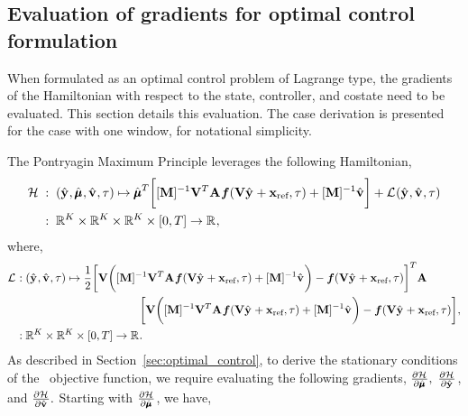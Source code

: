 \documentclass[3p,computermodern,10pt]{elsarticle}
\begin{document}
\begin{appendices}
\section{Evaluation of gradients for optimal control formulation}\label{appendix:optimal_control}
When formulated as an optimal control problem of Lagrange type, the gradients of the Hamiltonian with respect to the state, controller, and costate 
need to be evaluated. This section details this evaluation. The case derivation is presented for the case with one window, for notational simplicity.

The Pontryagin Maximum Principle leverages the following Hamiltonian,
\begin{align*}
\mathcal{H} \; &: \;  (\hat{\mathbf{y}}^{},\hat{\pmb \mu}^{},\hat{\mathbf{v}}^{},\tau) \mapsto 
 \hat{\pmb \mu}^{T} \bigg[  [\mathbf{M}]^{-1}\mathbf {V}^T \mathbf{A}^{}\boldsymbol f(\mathbf {V} \hat{\mathbf{y}}^{} + \mathbf{x}_\text{ref},\tau) + [\mathbf{M}]^{-1}\hat{\mathbf{v}}^{} \bigg] +  \mathcal{L}^{}(\hat{\mathbf{y}}^{},\hat{\mathbf{v}}^{},\tau) \\
&: \; \mathbb{R}^{K} \times \mathbb{R}^{K} \times \mathbb{R}^{K} \times [0,T] \rightarrow \mathbb{R}^{},
\end{align*} 
where,
\begin{align*}
 \mathcal{L}^{} &:  (\hat{\mathbf{y}}^{},\hat{\mathbf{v}}^{},\tau)
\mapsto \frac{1}{2} \bigg[ \mathbf {V} \bigg(  [\mathbf{M}]^{-1}\mathbf {V}^T
\mathbf{A}^{}  \boldsymbol f(\mathbf {V} \hat{\mathbf{y}}^{} + \mathbf{x}_\text{ref},\tau) + [\mathbf{M}]^{-1}\hat{\mathbf{v}}^{} \bigg) -
\boldsymbol f(\mathbf {V} \hat{\mathbf{y}}^{} + \mathbf{x}_\text{ref},\tau) \bigg]^T
\mathbf{A}^{}  \\ & \hspace{1.5 in}\bigg[ \mathbf {V} \bigg(
[\mathbf{M}]^{-1}\mathbf {V}^T \mathbf{A}^{}\boldsymbol f(\mathbf {V} \hat{\mathbf{y}}^{} + \mathbf{x}_\text{ref},\tau) + [\mathbf{M}]^{-1}\hat{\mathbf{v}}^{}
\bigg) - \boldsymbol f( \mathbf {V} \hat{\mathbf{y}}^{} + \mathbf{x}_\text{ref},\tau ) \bigg]
, \nonumber \\ & : \mathbb{R}^{K} \times \mathbb{R}^{K} \times [0,T] \rightarrow \mathbb{R}^{}.
\end{align*} 
As described in Section~\ref{sec:optimal_control}, to derive the stationary conditions of the \methodAcronym\ objective function, we require evaluating the following gradients,
$ \frac{\partial \mathcal{H}^{}}{\partial \hat{\pmb \mu}^{}{}}, \;   \frac{\partial \mathcal{H}^{}}{\partial \hat{\mathbf{y}}^{}{}}$, and $\frac{\partial \mathcal{H}^{}}{\partial \hat{\mathbf{v}}^{}{}}.$  Starting with $\frac{\partial \mathcal{H}^{}}{\partial \hat{\pmb \mu}^{}{}}$, we have,

\end{appendices}
\end{document}
